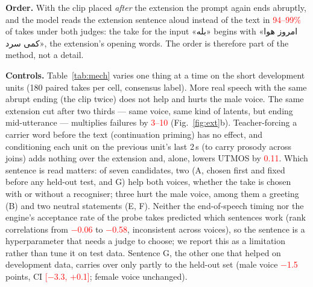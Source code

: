 \documentclass[conference]{IEEEtran}
\newcommand{\fa}[1]{{\persianfont\beginR #1\endR}}
\newcommand{\RES}[1]{\textcolor{red}{#1}}
\begin{document}
\textbf{Order.} With the clip placed \emph{after} the extension the prompt again ends abruptly, and the model
reads the extension sentence aloud instead of the text in \RES{94--99\%} of takes under both judges: the
take for the input \fa{«بله»} begins with \fa{«امروز هوا کمی سرد»}, the extension's opening words. The order
is therefore part of the method, not a detail.

\textbf{Controls.} Table~\ref{tab:mech} varies one thing at a time on the short development units
(180 paired takes per cell, consensus label). More real speech with the same abrupt ending (the clip twice)
does not help and hurts the male voice. The same extension cut after two thirds --- same voice, same kind of
latents, but ending mid-utterance --- multiplies failures by \RES{3--10} (Fig.~\ref{fig:ext}b). Teacher-forcing a carrier word
before the text (continuation priming) has no effect, and conditioning each unit on the previous unit's last
2\,s (to carry prosody across joins) adds nothing over the extension and, alone, lowers UTMOS by
\RES{0.11}. Which sentence is read matters: of seven candidates,
two (A, chosen first and fixed before any held-out test, and G) help both voices, whether the take is chosen
with or without a recogniser; three hurt the male voice, among them a greeting (B) and two neutral statements
(E, F). Neither the end-of-speech timing nor the engine's acceptance rate of the probe takes predicted which
sentences work (rank correlations from \RES{$-$0.06} to \RES{$-$0.58}, inconsistent across voices), so the
sentence is a hyperparameter that needs a judge to choose; we report this as a limitation rather than tune
it on test data. Sentence G, the other one that helped on development data, carries over only partly to the
held-out set (male voice \RES{$-$1.5} points, CI \RES{[$-$3.3, +0.1]}; female voice unchanged).
\end{document}

